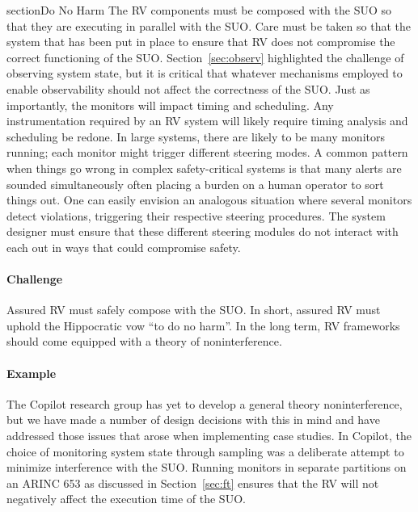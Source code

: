 section{Do No Harm} \label{sec:noninter}         
The RV components must be composed with the SUO so that they are
executing in parallel with the SUO.   Care must be taken so that the
system that has been put in place to ensure that  RV does not
compromise the correct functioning of the SUO.  
Section~\ref{sec:observ} highlighted the challenge of observing system
state, but it is critical that whatever mechanisms employed to enable
observability should not affect the correctness of the SUO.  Just as
importantly, the monitors will impact timing and scheduling. Any
instrumentation required by an RV system will likely require timing
analysis and scheduling be redone. In large systems, there are likely
to be many monitors running; each monitor might trigger different
steering modes. A common pattern when things go wrong in complex
safety-critical systems is that many alerts are sounded simultaneously
often  placing a burden on a human operator to sort things out.  One
can easily envision an analogous situation where several monitors
detect violations, triggering their respective steering
procedures. The system designer must ensure that these different
steering modules do not interact with each out in ways that could
compromise safety. 

\paragraph{Challenge} Assured RV must safely compose with the SUO. In
short, assured RV must uphold the Hippocratic vow ``to do no harm''.
In the long term,  RV frameworks should come equipped with a theory of
noninterference. 

\paragraph{Example}  
The Copilot research group has yet to develop a general theory
noninterference, but we have made a number of design decisions with
this in mind and have addressed those issues that arose when
implementing case studies.  In Copilot, the choice of monitoring
system state through sampling was a deliberate attempt to minimize
interference with the SUO. Running monitors in separate partitions on
an ARINC 653 as discussed in Section~\ref{sec:ft} ensures that the RV
will not negatively affect the execution time of the SUO. 



 

